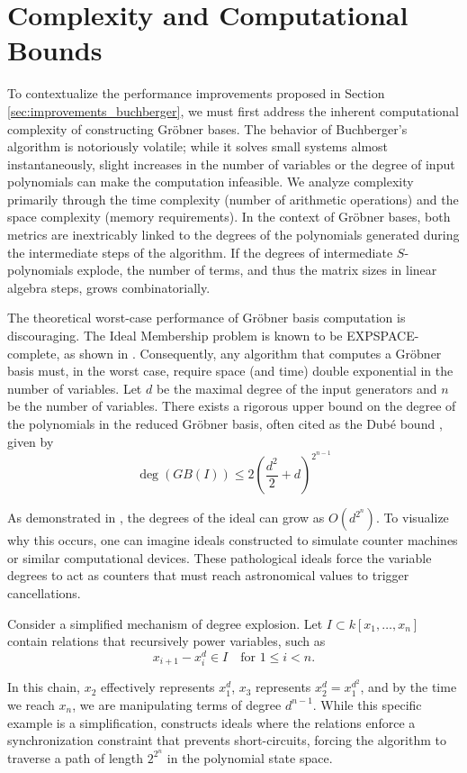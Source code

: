 \section{Complexity and Computational Bounds}

To contextualize the performance improvements proposed in Section \ref{sec:improvements_buchberger}, we must first address the inherent computational complexity of constructing Gröbner bases. The behavior of Buchberger's algorithm is notoriously volatile; while it solves small systems almost instantaneously, slight increases in the number of variables or the degree of input polynomials can make the computation infeasible. We analyze complexity primarily through the time complexity (number of arithmetic operations) and the space complexity (memory requirements). In the context of Gröbner bases, both metrics are inextricably linked to the degrees of the polynomials generated during the intermediate steps of the algorithm. If the degrees of intermediate $S$-polynomials explode, the number of terms, and thus the matrix sizes in linear algebra steps, grows combinatorially.

The theoretical worst-case performance of Gröbner basis computation is discouraging. The Ideal Membership problem is known to be EXPSPACE-complete, as shown in \cite{Mayr1982_ComplexityWordProblems}. Consequently, any algorithm that computes a Gröbner basis must, in the worst case, require space (and time) double exponential in the number of variables. Let $d$ be the maximal degree of the input generators and $n$ be the number of variables. There exists a rigorous upper bound on the degree of the polynomials in the reduced Gröbner basis, often cited as the Dubé bound \cite{Maletzky2019_DubeDegrees, bayer1993_WhatCanBeComputed}, given by
$$
\deg(GB(I)) \leq 2 \left( \frac{d^2}{2} + d \right)^{2^{n-1}}
$$

As demonstrated in \cite{Bayer1988_ComplexityOfSyzygies, Koh1998_QuadricsDoubleExp}, the degrees of the ideal can grow as $O(d^{2^n})$. To visualize why this occurs, one can imagine ideals constructed to simulate counter machines or similar computational devices. These pathological ideals force the variable degrees to act as counters that must reach astronomical values to trigger cancellations.

\begin{example}
Consider a simplified mechanism of degree explosion. Let $I \subset k[x_1, \dots, x_n]$ contain relations that recursively power variables, such as
$$
x_{i+1} - x_i^d \in I \quad \text{for } 1 \leq i < n.
$$

In this chain, $x_2$ effectively represents $x_1^d$, $x_3$ represents $x_2^d = x_1^{d^2}$, and by the time we reach $x_n$, we are manipulating terms of degree $d^{n-1}$. While this specific example is a simplification, \cite{Mayr1982_ComplexityWordProblems} constructs ideals where the relations enforce a synchronization constraint that prevents short-circuits, forcing the algorithm to traverse a path of length $2^{2^n}$ in the polynomial state space.
\end{example}


